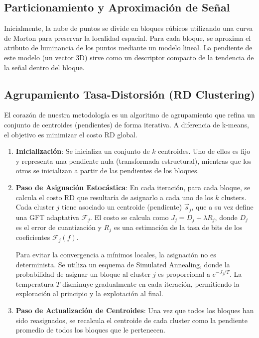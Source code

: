 \subsection{Particionamiento y Aproximación de Señal}
Inicialmente, la nube de puntos se divide en bloques cúbicos utilizando una curva de Morton para preservar la
localidad espacial. Para cada bloque, se aproxima el atributo de luminancia de los puntos mediante un modelo lineal.
La pendiente de este modelo (un vector 3D) sirve como un descriptor compacto de la tendencia de la señal dentro del
bloque.

\subsection{Agrupamiento Tasa-Distorsión (RD Clustering)}
El corazón de nuestra metodología es un algoritmo de agrupamiento que refina un conjunto de centroides (pendientes) de
forma iterativa. A diferencia de k-means, el objetivo es minimizar el costo RD global.

\begin{enumerate}
\item \textbf{Inicialización}: Se inicializa un conjunto de $k$ centroides. Uno de ellos es fijo y representa una
pendiente nula (transformada estructural), mientras que los otros se inicializan a partir de las pendientes de los
bloques.

\item \textbf{Paso de Asignación Estocástica}: En cada iteración, para cada bloque, se calcula el costo RD que
resultaría de asignarlo a cada uno de los $k$ clusters. Cada cluster $j$ tiene asociado un centroide (pendiente)
$\vec{s}_j$, que a su vez define una GFT adaptativa $\mathcal{F}_j$. El costo se calcula como $J_j = D_j + \lambda
R_j$, donde $D_j$ es el error de cuantización y $R_j$ es una estimación de la tasa de bits de los coeficientes
$\mathcal{F}_j(f)$.

Para evitar la convergencia a mínimos locales, la asignación no es determinista. Se utiliza un esquema de Simulated
Annealing, donde la probabilidad de asignar un bloque al cluster $j$ es proporcional a $e^{-J_j/T}$. La temperatura
$T$ disminuye gradualmente en cada iteración, permitiendo la exploración al principio y la explotación al final.

\item \textbf{Paso de Actualización de Centroides}: Una vez que todos los bloques han sido reasignados, se recalcula
el centroide de cada cluster como la pendiente promedio de todos los bloques que le pertenecen.
\end{enumerate}


